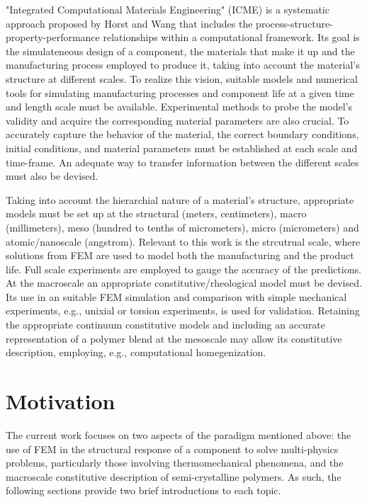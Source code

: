 "Integrated Computational Materials Engineering" (ICME) is a systematic approach proposed by Horst and Wang \citep{horstemeyerCradletograveSimulationbasedDesign2003} that includes the process-structure-property-performance relationships within a computational framework.
Its goal is the simulateneous design of a component, the materials that make it up and the manufacturing process employed to produce it, taking into account the material's structure at different scales.
To realize this vision, suitable models and numerical tools for simulating manufacturing processes and component life at a given time and length scale must be available.
Experimental methods to probe the model's validity and acquire the corresponding material parameters are also crucial.
To accurately capture the behavior of the material, the correct boundary conditions, initial conditions, and material parameters must be established at each scale and time-frame.
An adequate way to transfer information between the different scales must also be devised.

Taking into account the hierarchial nature of a material's structure, appropriate models must be set up at the structural (meters, centimeters), macro (millimeters), meso (hundred to tenths of micrometers), micro (micrometers) and atomic/nanoscale (angstrom).
Relevant to this work is the strcutrual scale, where solutions from FEM are used to model both the manufacturing and the product life.
Full scale experiments are employed to gauge the accuracy of the predictions.
At the macroscale an appropriate constitutive/rheological model must be devised.
Its use in an suitable FEM simulation and comparison with simple mechanical experiments, e.g., unixial or torsion experiments, is used for validation.
Retaining the appropriate continuum constitutive models and including an accurate representation of a polymer blend at the mesoscale may allow its constitutive description, employing, e.g., computational homegenization.

\section{Motivation}

The current work focuses on two aspects of the paradigm mentioned above: the use of FEM in the structural response of a component to solve multi-physics problems, particularly those involving thermomechanical phenomena, and the macroscale constitutive description of semi-crystalline polymers.
As such, the following sections provide two brief introductions to each topic.


